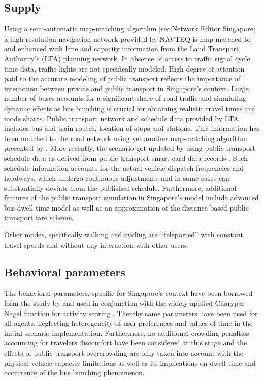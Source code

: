\subsection{Supply}
Using a semi-automatic map-matching algorithm \ref{sec:Network Editor Singapore} a high-resolution navigation network provided by NAVTEQ is map-matched to and enhanced with lane and capacity information from the Land Transport Authority's (LTA) planning network. In absence of access to traffic signal cycle time data, traffic lights are not specifically modeled.
High degree of attention paid to the accurate modeling of public transport reflects the importance of interaction between private and public transport in Singapore’s context. Large number of buses accounts for a significant share of road traffic and simulating dynamic effects as bus bunching is crucial for obtaining realistic travel times and mode shares. Public transport network and schedule data provided by LTA includes bus and train routes, location of stops and stations. This information has been matched to the road network using yet another map-matching algorithm presented by \citet[][]{Ordonez_HKSTS_2011, Ordonez_Webpage_2011_4}. More recently, the scenario got updated by using public transport schedule data as derived from public transport smart card data records \citet[][]{Fourie_TechRep_FCL_2014}. Such schedule information accounts for the actual vehicle dispatch frequencies and headways, which undergo continuous adjustments and in some cases can substantially deviate from the published schedule. Furthermore, additional features of the public transport simulation in Singapore’s model include advanced bus dwell time model \cite[][]{SunEtAl_TransResA_2014} as well as an approximation of the distance based public transport fare scheme.

Other modes, specifically walking and cycling are ``teleported'' with constant travel speeds and without any interaction with other users. 

\subsection{Behavioral parameters}
The behavioral parameters, specific for Singapore's context have been borrowed form the study by \citet[][]{LTA_unpub_2009} and used in conjunction with the widely applied Charypar-Nagel function for activity scoring \citet[][]{CharyparNagel_Transportation_2005}. Thereby same parameters have been used for all agents, neglecting heterogeneity of user preferences and values of time in the initial scenario implementation. Furthermore, no additional crowding penalties accounting for travelers discomfort have been considered at this stage and the effects of public transport overcrowding are only taken into account with the physical vehicle capacity limitations as well as its implications on dwell time and occurrence of the bus bunching phenomenon. 

